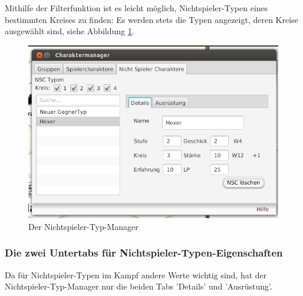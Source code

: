 \documentclass[11pt, a4paper, german]{article}
\begin{document}
Mithilfe der Filterfunktion ist es leicht möglich, Nichtspieler-Typen eines bestimmten Kreises zu finden: Es werden stets die Typen angezeigt, deren Kreise ausgewählt sind, siehe Abbildung \ref{fig:Nichtspielertypmanager1}.
\begin{figure}
\centering
\includegraphics[width=1\linewidth]{Bilder/Nichtspielertypmanager1}
\caption{Der Nichtspieler-Typ-Manager}
\label{fig:Nichtspielertypmanager1}
\end{figure}

\subsubsection{Die zwei Untertabs für Nichtspieler-Typen-Eigenschaften}
Da für Nichtspieler-Typen im Kampf andere Werte wichtig sind, hat der Nichtspieler-Typ-Manager nur die beiden Tabs 'Details' und 'Ausrüstung'.\\
\end{document}
